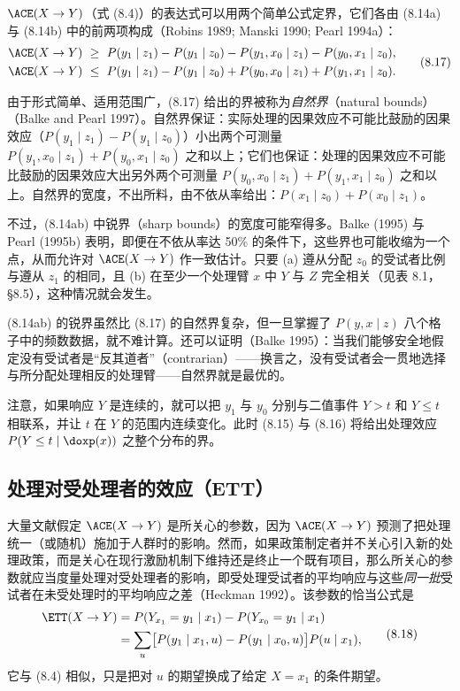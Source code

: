 $\ACE(X\to Y)$（式 \textup{(8.4)}）的表达式可以用两个简单公式定界，它们各由 \textup{(8.14a)} 与 \textup{(8.14b)} 中的前两项构成（Robins 1989; Manski 1990; Pearl 1994a）：
\begin{equation}
\begin{aligned}
\ACE(X\to Y)&\ \ge\ P(y_1\mid z_1)-P(y_1\mid z_0)-P(y_1,x_0\mid z_1)-P(y_0,x_1\mid z_0),\\
\ACE(X\to Y)&\ \le\ P(y_1\mid z_1)-P(y_1\mid z_0)+P(y_0,x_0\mid z_1)+P(y_1,x_1\mid z_0).
\end{aligned} \tag{8.17}
\end{equation}

由于形式简单、适用范围广，\textup{(8.17)} 给出的界被称为\emph{自然界}（natural bounds）（Balke and Pearl 1997）。自然界保证：实际处理的因果效应不可能比鼓励的因果效应（$P(y_1\mid z_1)-P(y_1\mid z_0)$）小出两个可测量 $P(y_1,x_0\mid z_1)+P(y_0,x_1\mid z_0)$ 之和以上；它们也保证：处理的因果效应不可能比鼓励的因果效应大出另外两个可测量 $P(y_0,x_0\mid z_1)+P(y_1,x_1\mid z_0)$ 之和以上。自然界的宽度，不出所料，由不依从率给出：$P(x_1\mid z_0)+P(x_0\mid z_1)$。

不过，\textup{(8.14ab)} 中锐界（sharp bounds）的宽度可能窄得多。Balke (1995) 与 Pearl (1995b) 表明，即便在不依从率达 50\% 的条件下，这些界也可能收缩为一个点，从而允许对 $\ACE(X\to Y)$ 作一致估计。只要 (a) 遵从分配 $z_0$ 的受试者比例与遵从 $z_1$ 的相同，且 (b) 在至少一个处理臂 $x$ 中 $Y$ 与 $Z$ 完全相关（见表 8.1，\S 8.5），这种情况就会发生。

\textup{(8.14ab)} 的锐界虽然比 \textup{(8.17)} 的自然界复杂，但一旦掌握了 $P(y,x\mid z)$ 八个格子中的频数数据，就不难计算。还可以证明（Balke 1995）：当我们能够安全地假定没有受试者是“反其道者”（contrarian）——换言之，没有受试者会一贯地选择与所分配处理相反的处理臂——自然界就是最优的。

注意，如果响应 $Y$ 是连续的，就可以把 $y_1$ 与 $y_0$ 分别与二值事件 $Y>t$ 和 $Y\le t$ 相联系，并让 $t$ 在 $Y$ 的范围内连续变化。此时 \textup{(8.15)} 与 \textup{(8.16)} 将给出处理效应 $P(Y\le t\mid\doxp(x))$ 之整个分布的界。

\subsection{处理对受处理者的效应（ETT）}

大量文献假定 $\ACE(X\to Y)$ 是所关心的参数，因为 $\ACE(X\to Y)$ 预测了把处理统一（或随机）施加于人群时的影响。然而，如果政策制定者并不关心引入新的处理政策，而是关心在现行激励机制下维持还是终止一个既有项目，那么所关心的参数就应当度量处理对受处理者的影响，即受处理受试者的平均响应与这些\emph{同一批}受试者在未受处理时的平均响应之差（Heckman 1992）。该参数的恰当公式是
\begin{equation}
\begin{aligned}
\ETT(X\to Y)&=P(Y_{x_1}=y_1\mid x_1)-P(Y_{x_0}=y_1\mid x_1)\\
&=\sum_{u}\bigl[P(y_1\mid x_1,u)-P(y_1\mid x_0,u)\bigr]P(u\mid x_1),
\end{aligned} \tag{8.18}
\end{equation}
它与 \textup{(8.4)} 相似，只是把对 $u$ 的期望换成了给定 $X=x_1$ 的条件期望。

